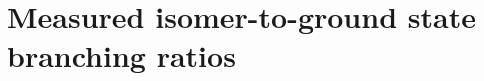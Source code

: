 \documentclass[3p]{elsarticle}
\newcommand{\subfigimg}[4][,]{%
  \setbox1=\hbox{\texttt{[image: \#3]}}%
  \leavevmode\rlap{\usebox1}%
  \rlap{\hspace*{#4pt}\raisebox{\dimexpr\ht1-2\baselineskip}{#2}}%
  \phantom{\usebox1}%
}
\begin{document}




% 
% 
\section{Measured isomer-to-ground state branching ratios } \label{ibr_figures}
\end{document}

